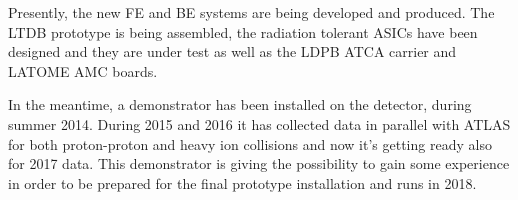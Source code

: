 \documentclass{llncs}
\begin{document}
Presently, the new FE and BE systems are being developed and produced. The LTDB prototype is being assembled, the radiation tolerant ASICs have been designed and they are under test as well as the LDPB ATCA carrier and LATOME AMC boards. 

In the meantime, a demonstrator has been installed on the detector, during summer 2014. During 2015 and 2016 it has collected data in parallel with ATLAS for both proton-proton and heavy ion collisions and now it's getting ready also for 2017 data. This demonstrator is giving the possibility to gain some experience in order to be prepared for the final prototype installation and runs in 2018.

%


\end{document}
